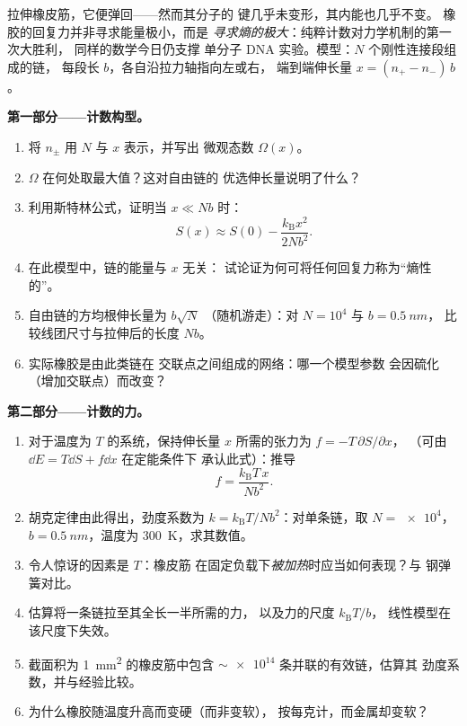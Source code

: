 \begin{problem}\label{pb:b3:microcanonical-ensemble:1}
拉伸橡皮筋，它便弹回——然而其分子的
键几乎未变形，其内能也几乎不变。
橡胶的回复力并非寻求能量极小，而是
\emph{寻求熵的极大}：纯粹计数对力学机制的第一次大胜利，
同样的数学今日仍支撑
单分子 DNA 实验。模型：$N$ 个刚性连接段组成的链，
每段长 $b$，各自沿拉力轴指向左或右，
端到端伸长量 $x = (n_+ - n_-)\,b$。

\medskip\noindent\textbf{第一部分——计数构型。}
\begin{enumerate}
  \item 将 $n_\pm$ 用 $N$ 与 $x$ 表示，并写出
        微观态数 $\Omega(x)$。
  \item $\Omega$ 在何处取最大值？这对自由链的
        优选伸长量说明了什么？
  \item 利用斯特林公式，证明当 $x \ll Nb$ 时：
        \[
        S(x) \approx S(0) - \frac{k_{\text{B}}x^2}{2Nb^2} .
        \]
  \item 在此模型中，链的能量与 $x$ 无关：
        试论证为何可将任何回复力称为“熵性的”。
  \item 自由链的方均根伸长量为 $b\sqrt N$
        （随机游走）：对 $N = 10^4$ 与 $b = \qty{0.5}{nm}$，
        比较线团尺寸与拉伸后的长度 $Nb$。
  \item 实际橡胶是由此类链在
        交联点之间组成的网络：哪一个模型参数
        会因硫化（增加交联点）而改变？
\end{enumerate}

\medskip\noindent\textbf{第二部分——计数的力。}
\begin{enumerate}[resume]
  \item 对于温度为 $T$ 的系统，保持伸长量
        $x$ 所需的张力为 $f = -T\,\partial S/\partial x$，
        （可由 $\dd E = T\dd S + f\dd x$ 在定能条件下
        承认此式）：推导
        \[
        f = \frac{k_{\text{B}}T\,x}{Nb^2} .
        \]
  \item 胡克定律由此得出，劲度系数为 $k =
        k_{\text{B}}T/Nb^2$：对单条链，取 $N =
        \num{e4}$，$b = \qty{0.5}{nm}$，温度为 \qty{300}{K}，求其数值。
  \item 令人惊讶的因素是 $T$：橡皮筋
        在固定负载下\emph{被加热}时应当如何表现？与
        钢弹簧对比。
  \item 估算将一条链拉至其全长一半所需的力，
        以及力的尺度 $k_{\text{B}}T/b$，
        线性模型在该尺度下失效。
  \item 截面积为 \qty{1}{mm^2} 的橡皮筋中包含
        $\sim\num{e14}$ 条并联的有效链，估算其
        劲度系数，并与经验比较。
  \item 为什么橡胶随温度升高而变硬（而非变软），
        按每克计，而金属却变软？
\end{enumerate}


\end{problem}
